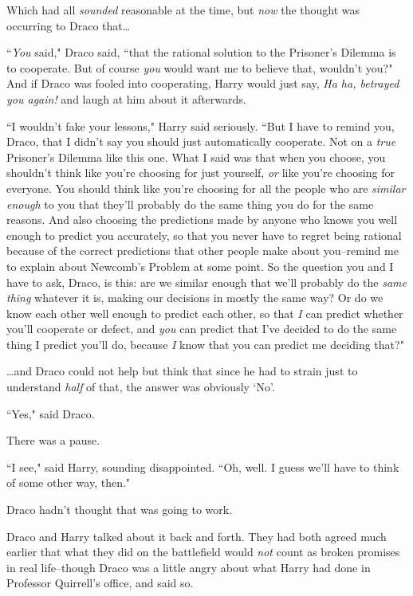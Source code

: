 Which had all \emph{sounded} reasonable at the time, but \emph{now} the thought was occurring to Draco that{\ldots}

``\emph{You} said," Draco said, ``that the rational solution to the Prisoner's Dilemma is to cooperate. But of course \emph{you} would want me to believe that, wouldn't you?" And if Draco was fooled into cooperating, Harry would just say, \emph{Ha ha, betrayed you again!} and laugh at him about it afterwards.

``I wouldn't fake your lessons," Harry said seriously. ``But I have to remind you, Draco, that I didn't say you should just automatically cooperate. Not on a \emph{true} Prisoner's Dilemma like this one. What I said was that when you choose, you shouldn't think like you're choosing for just yourself, \emph{or} like you're choosing for everyone. You should think like you're choosing for all the people who are \emph{similar enough} to you that they'll probably do the same thing you do for the same reasons. And also choosing the predictions made by anyone who knows you well enough to predict you accurately, so that you never have to regret being rational because of the correct predictions that other people make about you\---remind me to explain about Newcomb's Problem at some point. So the question you and I have to ask, Draco, is this: are we similar enough that we'll probably do the \emph{same thing} whatever it is, making our decisions in mostly the same way? Or do we know each other well enough to predict each other, so that \emph{I} can predict whether you'll cooperate or defect, and \emph{you} can predict that I've decided to do the same thing I predict you'll do, because \emph{I} know that you can predict me deciding that?"

{\ldots}and Draco could not help but think that since he had to strain just to understand \emph{half} of that, the answer was obviously `No'.

``Yes," said Draco.

There was a pause.

``I see," said Harry, sounding disappointed. ``Oh, well. I guess we'll have to think of some other way, then."

Draco hadn't thought that was going to work.

Draco and Harry talked about it back and forth. They had both agreed much earlier that what they did on the battlefield would \emph{not} count as broken promises in real life\---though Draco was a little angry about what Harry had done in Professor Quirrell's office, and said so.

